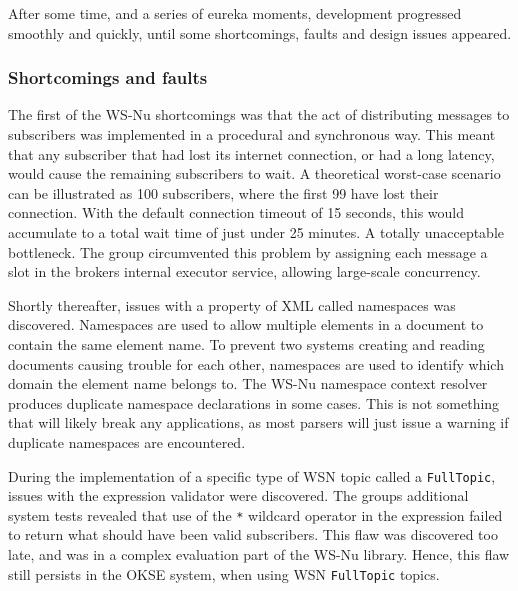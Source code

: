 After some time, and a series of eureka moments, development progressed smoothly and quickly, until some shortcomings, faults and design issues appeared.

\subsubsection{Shortcomings and faults}
\label{subsec:evaluation-implementation-wsn-shortcomings_and_faults}

The first of the WS-Nu shortcomings was that the act of distributing messages to subscribers was implemented in a procedural and synchronous way. This meant that any subscriber that had lost its internet connection, or had a long latency, would cause the remaining subscribers to wait. A theoretical worst-case scenario can be illustrated as 100 subscribers, where the first 99 have lost their connection. With the default connection timeout of 15 seconds, this would accumulate to a total wait time of just under 25 minutes. A totally unacceptable bottleneck. The group circumvented this problem by assigning each message a slot in the brokers internal executor service, allowing large-scale concurrency.

Shortly thereafter, issues with a property of XML called namespaces was discovered. Namespaces are used to allow multiple elements in a document to contain the same element name. To prevent two systems creating and reading documents causing trouble for each other, namespaces are used to identify which domain the element name belongs to. The WS-Nu namespace context resolver produces duplicate namespace declarations in some cases. This is not something that will likely break any applications, as most parsers will just issue a warning if duplicate namespaces are encountered.

During the implementation of a specific type of WSN topic called a \verb!FullTopic!, issues with the expression validator were discovered. The groups additional system tests revealed that use of the \verb!*! wildcard operator in the expression failed to return what should have been valid subscribers. This flaw was discovered too late, and was in a complex evaluation part of the WS-Nu library. Hence, this flaw still persists in the OKSE system, when using WSN \verb!FullTopic! topics.

